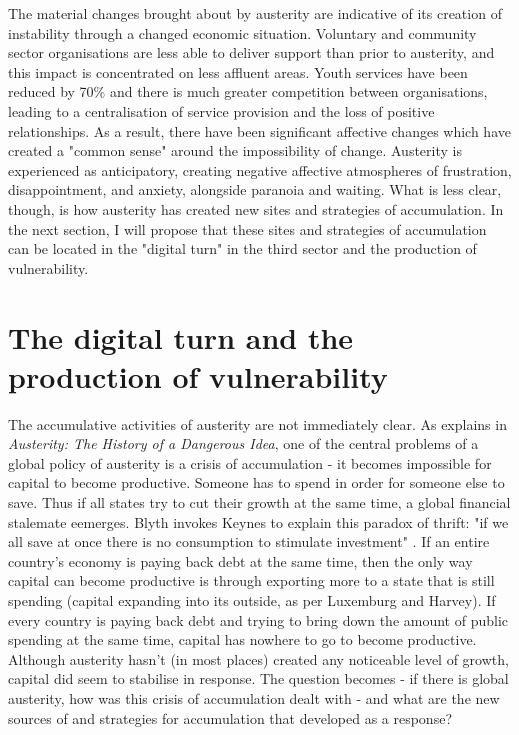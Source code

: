 The material changes brought about by austerity are indicative of its creation of instability through a changed economic situation. Voluntary and community sector organisations are less able to deliver support than prior to austerity, and this impact is concentrated on less affluent areas. Youth services have been reduced by 70\% and there is much greater competition between organisations, leading to a centralisation of service provision and the loss of positive relationships. As a result, there have been significant affective changes which have created a "common sense" around the impossibility of change. Austerity is experienced as anticipatory, creating negative affective atmospheres of frustration, disappointment, and anxiety, alongside paranoia and waiting. What is less clear, though, is how austerity has created new sites and strategies of accumulation. In the next section, I will propose that these sites and strategies of accumulation can be located in the "digital turn" in the third sector and the production of vulnerability.

\section{The digital turn and the production of vulnerability }
\label{the-digital-turn-and-the-production-of-vulnerability}
The accumulative activities of austerity are not immediately clear. As \citet{blyth_austerity_2013} explains in \emph{Austerity: The History of a Dangerous Idea}, one of the central problems of a global policy of austerity is a crisis of accumulation - it becomes impossible for capital to become productive. Someone has to spend in order for someone else to save. Thus if all states try to cut their growth at the same time,  a global financial stalemate eemerges. Blyth invokes Keynes to explain this paradox of thrift: "if we all save at once there is no consumption to stimulate investment" \citep[8]{blyth_austerity_2013}. If an entire country's economy is paying back debt at the same time, then the only way capital can become productive is through exporting more to a state that is still spending (capital expanding into its outside, as per Luxemburg and Harvey). If every country is paying back debt and trying to bring down the amount of public spending at the same time, capital has nowhere to go to become productive. Although austerity hasn't (in most places) created any noticeable level of growth, capital did seem to stabilise in response. The question becomes - if there is global austerity, how was this crisis of accumulation dealt with - and what are the new sources of and strategies for accumulation that developed as a response?

